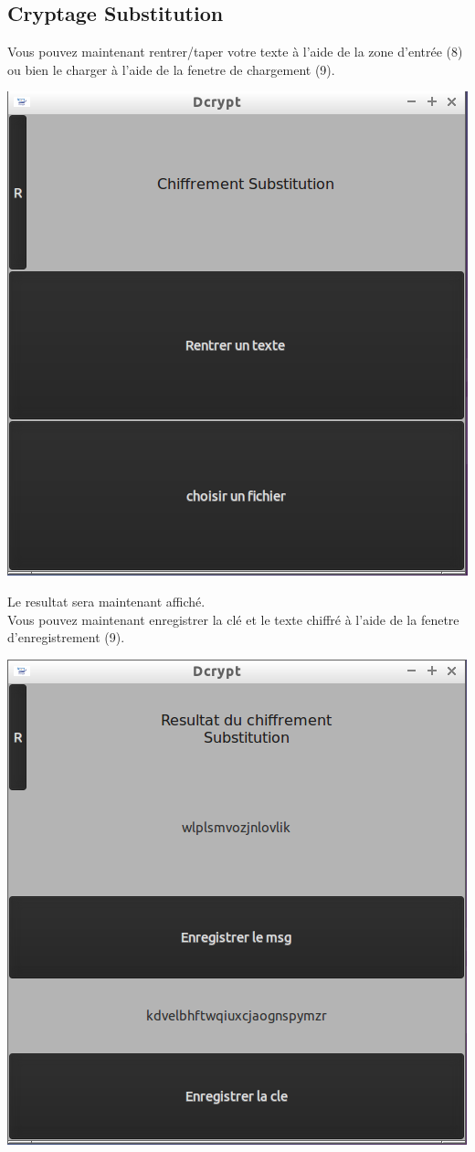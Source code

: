 \documentclass[a4]{article}
\begin{document}
		\subsection{Cryptage Substitution}
			Vous pouvez maintenant rentrer/taper votre texte à l'aide de la zone d'entrée (8)
 			ou bien le charger à l'aide de la fenetre de chargement (9).
			\begin{center}\includegraphics[scale=0.4]{3.png}\end{center}
			Le resultat sera maintenant affiché. \\
 			Vous pouvez maintenant enregistrer la clé et le texte chiffré à l'aide 
 			de la fenetre d'enregistrement (9).
			\begin{center}\includegraphics[scale=0.4]{5.png}\end{center}
\end{document}
